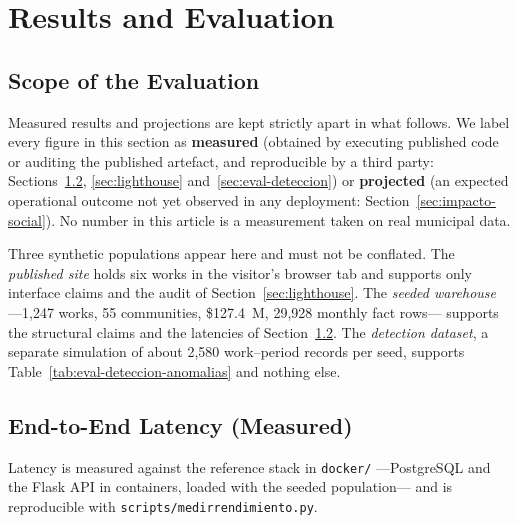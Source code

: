 \documentclass[runningheads]{llncs}
\renewcommand{\_}{\origunderscore\allowbreak}
\begin{document}
\section{Results and Evaluation}
\label{sec:resultados}

\subsection{Scope of the Evaluation}
\label{sec:alcance}
\begingroup
Measured results and projections are kept strictly apart in what follows. We label every figure in this section as \textbf{measured} (obtained by executing published code or auditing the published artefact, and reproducible by a third party: Sections~\ref{sec:objetivos}, \ref{sec:lighthouse} and~\ref{sec:eval-deteccion}) or \textbf{projected} (an expected operational outcome not yet observed in any deployment: Section~\ref{sec:impacto-social}). No number in this article is a measurement taken on real municipal data.

Three synthetic populations appear here and must not be conflated. The
\emph{published site} holds six works in the visitor's browser tab and supports
only interface claims and the audit of Section~\ref{sec:lighthouse}. The
\emph{seeded warehouse} ---1,247 works, 55 communities, \$127.4~M, 29,928
monthly fact rows--- supports the structural claims and the latencies of
Section~\ref{sec:objetivos}. The \emph{detection dataset}, a separate simulation
of about 2,580 work--period records per seed, supports
Table~\ref{tab:eval-deteccion-anomalias} and nothing else.
\endgroup


\subsection{End-to-End Latency (Measured)}
\label{sec:objetivos}

Latency is measured against the reference stack in \texttt{docker/} ---PostgreSQL
and the Flask API in containers, loaded with the seeded population--- and is
reproducible with \texttt{scripts/medir\_rendimiento.py}.
\end{document}
